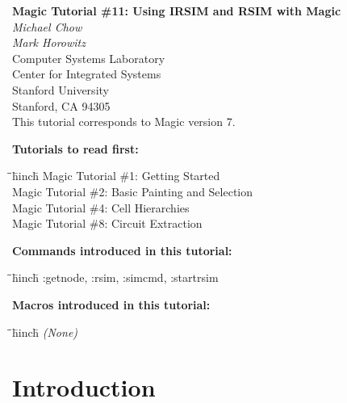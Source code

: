 \documentclass[letterpaper,twoside,12pt]{article}
\def\hinch{\hspace*{0.5in}}
\def\starti{\begin{center}\begin{tabbing}\hinch\=\hinch\=\hinch\=hinch\hinch\=\kill}
\def\endi{\end{tabbing}\end{center}}
\def\mytitle{Magic Tutorial \#11: Using IRSIM and RSIM with Magic}
\begin{document}
\makeatletter
\newcommand{\ps@magic}{%
	\renewcommand{\@oddhead}{\mytitle\hfil\today}%
	\renewcommand{\@evenhead}{\today\hfil\mytitle}%
	\renewcommand{\@evenfoot}{\hfil\textrm{--{\thepage}--}\hfil}%
	\renewcommand{\@oddfoot}{\@evenfoot}}
\newcommand{\ps@mplain}{%
	\renewcommand{\@oddhead}{}%
	\renewcommand{\@evenhead}{}%
	\renewcommand{\@evenfoot}{\hfil\textrm{--{\thepage}--}\hfil}%
	\renewcommand{\@oddfoot}{\@evenfoot}}
\makeatother
\pagestyle{magic}
\thispagestyle{mplain}


\begin{center}
  {\bfseries \Large \mytitle} \\
  \vspace*{0.5in}
  {\itshape Michael Chow} \\
  {\itshape Mark Horowitz} \\
  \vspace*{0.5in}
   Computer Systems Laboratory \\
   Center for Integrated Systems \\
   Stanford University \\
   Stanford, CA  94305 \\
  \vspace*{0.25in}
  This tutorial corresponds to Magic version 7. \\
\end{center}
\vspace*{0.5in}

{\noindent\bfseries\large Tutorials to read first:}
\starti
   \> Magic Tutorial \#1: Getting Started \\
   \> Magic Tutorial \#2: Basic Painting and Selection \\
   \> Magic Tutorial \#4: Cell Hierarchies \\
   \> Magic Tutorial \#8: Circuit Extraction
\endi

{\noindent\bfseries\large Commands introduced in this tutorial:}
\starti
   \> :getnode, :rsim, :simcmd, :startrsim
\endi

{\noindent\bfseries\large Macros introduced in this tutorial:}

\starti
   \> {\itshape (None)}
\endi

\vspace*{0.25in}
\section{Introduction}
\end{document}

